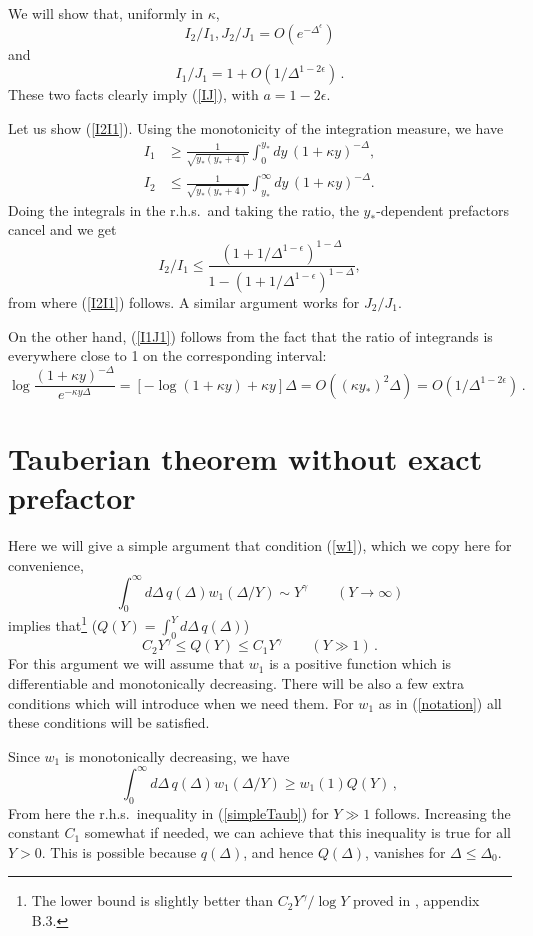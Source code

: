 \documentclass[12pt]{article}
\newcommand{\reef}[1]{(\ref{#1})}
\def\eps{\epsilon}
\newcommand{\beq}{\begin{equation}}
\newcommand{\eeq}{\end{equation}}
\def\nn{\nonumber}
\def\ge{\geqslant}
\def\le{\leqslant}
\def\nn{\nonumber}
\def\eps{\epsilon}
\newcommand{\D}{\Delta}
\numberwithin{equation}{section}
\begin{document}
We will show that, uniformly in $\kappa$,
\beq
\label{I2I1}
I_2/I_1, J_2/J_1 = O(e^{-\D^{\eps}})
\eeq
and 
\beq
\label{I1J1}
I_1/J_1 = 1+O(1/\D^{1-2\eps})\,.
\eeq
These two facts clearly imply \reef{IJ}, with $a=1-2\eps$.

Let us show \reef{I2I1}. Using the monotonicity of the integration measure, we have
\begin{align}
I_1&\ge \frac{1}{\sqrt{y_*(y_*+4)}}\int_0^{y_*} dy\,(1+\kappa y)^{-\D},\nn\\
I_2&\le \frac{1}{\sqrt{y_*(y_*+4)}}\int_{y_*}^{\infty} dy\, (1+\kappa y)^{-\D}.\label{monot}
\end{align}
Doing the integrals in the r.h.s.~and taking the ratio, the $y_*$-dependent prefactors cancel and we get
\beq
I_2/I_1 \le  
\frac{(1+1/\Delta^{1-\eps})^{1-\D}}
{1-(1+1/\Delta^{1-\eps})^{1-\Delta}},
\eeq
from where \reef{I2I1} follows. A similar argument works for $J_2/J_1$. 

On the other hand, \reef{I1J1} follows from the fact that the ratio of integrands is everywhere close to 1 on the corresponding interval:
\beq
\log \frac{(1+\kappa y)^{-\D}}{e^{-\kappa y \D}} = [-\log(1+\kappa y) +\kappa y]\D=O((\kappa y_*)^2\Delta)=O(1/\D^{1-2\eps})\,.
\eeq

\section{Tauberian theorem without exact prefactor}

\label{sec:simple}

Here we will give a simple argument that condition \reef{w1}, which we copy here for convenience,
\beq
\int_0^\infty d\D\,q(\D) w_1(\Delta/Y) \sim Y^\gamma \qquad (Y\to \infty)
\label{w1copy}
\eeq
 implies that\footnote{The lower bound is slightly better than $C_2 Y^\gamma/\log Y$ proved in \cite{Fitzpatrick:2012yx}, appendix B.3.} ($Q(Y)= \int_0^Y d\D\, q(\Delta)$)
\beq
C_2 Y^\gamma\le Q(Y)  \le C_1 Y^\gamma\qquad(Y\gg 1)\,.
\label{simpleTaub}
\eeq
For this argument we will assume that $w_1$ is a positive function which is differentiable and monotonically decreasing. There will be also a few extra conditions which will introduce when we need them.
For $w_1$ as in \reef{notation} all these conditions will be satisfied.

Since $w_1$ is monotonically decreasing, we have
\beq
\int_0^\infty d\D\,q(\D) w_1(\Delta/Y) \ge w_1(1) Q(Y)\,,
\eeq
From here the r.h.s.~inequality in \reef{simpleTaub} for $Y\gg 1$ follows. Increasing the constant $C_1$ somewhat if needed, we can achieve that this inequality is true for all $Y>0$. This is possible because $q(\Delta)$, and hence $Q(\Delta)$, vanishes for $\Delta\le \Delta_0$.
\end{document}
